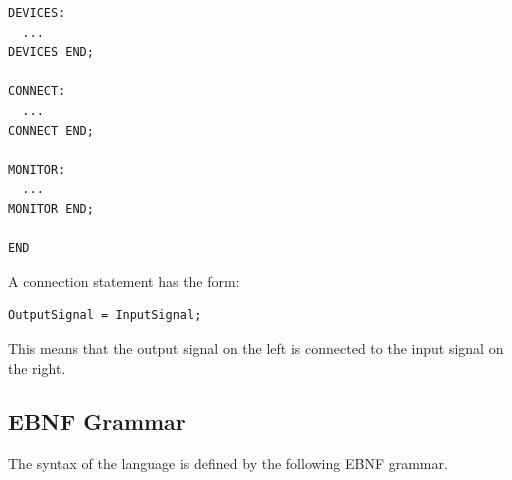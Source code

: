\documentclass[10pt,a4paper]{article}
\begin{document}
\begin{verbatim}
DEVICES:
  ...
DEVICES END;

CONNECT:
  ...
CONNECT END;

MONITOR:
  ...
MONITOR END;

END
\end{verbatim}

A connection statement has the form:

\begin{verbatim}
OutputSignal = InputSignal;
\end{verbatim}

This means that the output signal on the left is connected to the input signal
on the right.

\subsection{EBNF Grammar}

The syntax of the language is defined by the following EBNF grammar.
\end{document}
